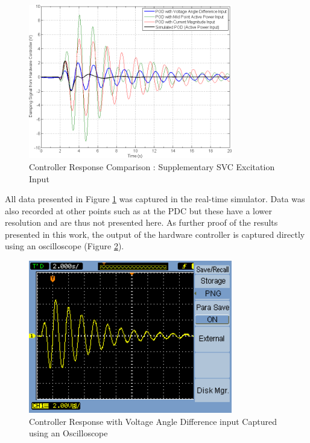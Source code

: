\documentclass[journal]{IEEEtran}
\begin{document}
\begin{figure}[!th]
\centering
\includegraphics[width=3.5in]{SVC_ResponseComparison_Labelled_NoVMag.png}
\caption{Controller Response Comparison : Supplementary SVC Excitation Input}
\label{SVC_Plots}
\end{figure}


All data presented in Figure \ref{SVC_Plots} was captured in the real-time simulator. Data was also recorded at other points such as at the PDC but these have a lower resolution and are thus not presented here. As further proof of the results presented in this work, the output of the hardware controller is captured directly using an oscilloscope (Figure \ref{ScopeCapture}).

\begin{figure}[!th]
\centering
\includegraphics[width=3.5in]{Best_sample.png}
\caption{Controller Response with Voltage Angle Difference input Captured using an Oscilloscope}
\label{ScopeCapture}
\end{figure}
\end{document}
